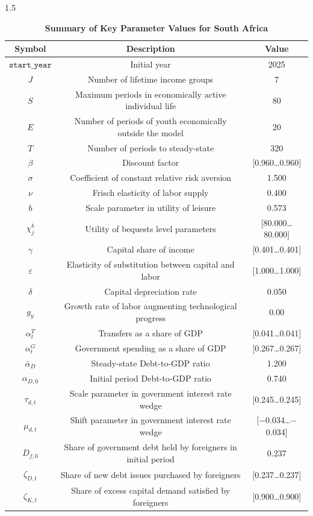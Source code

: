 \documentclass[letterpaper,12pt]{article}
\theoremstyle{definition}
\newcommand{\smallsize}{\small}
\begin{document}
\begin{spacing}{1.5}
\begin{table}[htbp]\centering\captionsetup{width=6.0in}
  \caption{\label{tab:zaf_params}\textbf{Summary of Key Parameter Values for South Africa}}
  \begin{threeparttable}
  \begin{tabular}{>{\smallsize}c |>{\smallsize}c |>{\smallsize}c}
\hline
\textbf{Symbol} & \textbf{Description} & \textbf{Value} \\
\hline\hline
$\texttt{start\_year}$ & Initial year & 2025 \\
$J$ & Number of lifetime income groups & 7 \\
$S$ & Maximum periods in economically active individual life & 80 \\
$E$ & Number of periods of youth economically outside the model & 20 \\
$T$ & Number of periods to steady-state & 320 \\
$\beta$ & Discount factor & [0.960\ldots0.960] \\
$\sigma$ & Coefficient of constant relative risk aversion & 1.500 \\
$\nu$ & Frisch elasticity of labor supply & 0.400 \\
$b$ & Scale parameter in utility of leisure & 0.573 \\
$\chi^{b}_{j}$ & Utility of bequests level parameters & [80.000\ldots80.000] \\
$\gamma$ & Capital share of income & [0.401\ldots0.401] \\
$\varepsilon$ & Elasticity of substitution between capital and labor & [1.000\ldots1.000] \\
$\delta$ & Capital depreciation rate & 0.050 \\
$g_{y}$ & Growth rate of labor augmenting technological progress & 0.00 \\
$\alpha^{T}_{t}$ & Transfers as a share of GDP & [0.041\ldots0.041] \\
$\alpha^{G}_{t}$ & Government spending as a share of GDP & [0.267\ldots0.267] \\
$\bar{\alpha}_{D}$ & Steady-state Debt-to-GDP ratio & 1.200 \\
$\alpha_{D,0}$ & Initial period Debt-to-GDP ratio & 0.740 \\
$\tau_{d,t}$ & Scale parameter in government interest rate wedge & [0.245\ldots0.245] \\
$\mu_{d,t}$ & Shift parameter in government interest rate wedge & [$-$0.034\ldots$-$0.034] \\
$D_{f,0}$ & Share of government debt held by foreigners in initial period & 0.237 \\
$\zeta_{D,t}$ & Share of new debt issues purchased by foreigners & [0.237\ldots0.237] \\
$\zeta_{K,t}$ & Share of excess capital demand satisfied by foreigners & [0.900\ldots0.900] \\
\hline\hline
  \end{tabular}
  \end{threeparttable}
\end{table}




\end{spacing}
\end{document}
